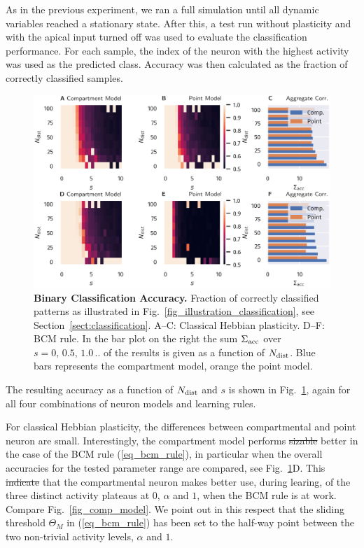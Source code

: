\documentclass[utf8]{frontiersSCNS} %
\providecommand{\DIFaddtex}[1]{{\protect\color{blue}\uwave{#1}}} %
\providecommand{\DIFdeltex}[1]{{\protect\color{red}\sout{#1}}}                      %
\providecommand{\DIFaddbegin}{} %
\providecommand{\DIFaddend}{} %
\providecommand{\DIFdelbegin}{} %
\providecommand{\DIFdelend}{} %
\providecommand{\DIFadd}[1]{\texorpdfstring{\DIFaddtex{#1}}{#1}} %
\providecommand{\DIFdel}[1]{\texorpdfstring{\DIFdeltex{#1}}{}} %
\begin{document}
As in the previous experiment, we ran a full simulation until 
all dynamic variables reached a stationary state. After this,
a test run without plasticity and with the apical input turned off 
was used to evaluate the classification	performance. 
For each sample, the index of the neuron with the highest 
activity was used as the predicted class. 
Accuracy was then calculated as the fraction
of correctly classified samples.
\begin{figure}[t]
\centering
\includegraphics[width=1.0\columnwidth]{classification_dimension_scaling_high_input_dim_composite}
\caption{{\bf Binary Classification Accuracy.}
Fraction of correctly classified patterns as illustrated in
Fig.~\ref{fig_illustration_classification}, see 
Section~\ref{sect:classification}. 
A--C: Classical Hebbian plasticity. 
D--F: BCM rule.
In the bar plot on the right the sum 
$\Sigma_{\rm acc}$ over $s=0,\,0.5,\,1.0\,..$ 
of the results is given as a function
of $N_{\rm dist}$. Blue bars 
represents the compartment model,
orange the point model.}
\label{fig:classification_accuracy}
\end{figure}

The resulting accuracy as a function of $N_{\rm dist}$ and $s$
is shown in Fig.~\ref{fig:classification_accuracy}, again for all
four combinations of neuron models and learning rules.

For classical Hebbian plasticity, the differences between
compartmental and point neuron are small. Interestingly,
the compartment model performs \DIFdelbegin \DIFdel{sizable }\DIFdelend \DIFaddbegin \DIFadd{measurably }\DIFaddend better in
the case of the BCM rule (\ref{eq_bcm_rule}), in 
particular when the overall accuracies for the 
tested parameter range are compared, see 
Fig.~\ref{fig:classification_accuracy}D.
This \DIFdelbegin \DIFdel{indicate }\DIFdelend \DIFaddbegin \DIFadd{indicates }\DIFaddend that the compartmental neuron
makes better use, during learing, of the
three distinct activity plateaus at
$0$, $\alpha$ and $1$, when the BCM
rule is at work. Compare
Fig.~\ref{fig_comp_model}. We point
out in this respect that the sliding 
threshold \DIFdelbegin \DIFdel{$\Theta_M$ }\DIFdelend \DIFaddbegin \DIFadd{$\theta_M$ }\DIFaddend in (\ref{eq_bcm_rule}) 
has been set to the half-way point between
the two non-trivial activity levels,
$\alpha$ and $1$. 
\end{document}
